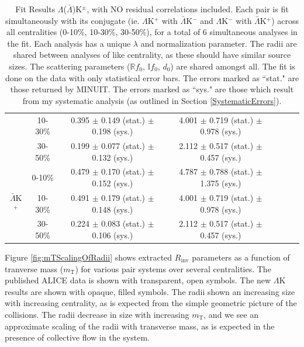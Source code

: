 \documentclass[../AnalysisNoteJBuxton.tex]{subfiles}
\begin{document}
\begin{landscape}
\begin{table}[htbp]
{\begin{tabular}{|c|c|c|c|c|c|c|}
   & 10-30\% & 0.395 $\pm$ 0.149 (stat.) $\pm$ 0.198 (sys.)  %
             & 4.001 $\pm$ 0.719 (stat.) $\pm$ 0.978 (sys.)  %
             & & & \\
             
   & 30-50\% & 0.199 $\pm$ 0.077 (stat.) $\pm$ 0.132 (sys.)  %
             & 2.112 $\pm$ 0.517 (stat.) $\pm$ 0.457 (sys.)  %
             & & & \\
  \cline{1-4}  
  \multirow{3}{*}{$\bar{\Lambda}$K$^{+}$}  
   &  0-10\% & 0.479 $\pm$ 0.170 (stat.) $\pm$ 0.152 (sys.)  %
             & 4.787 $\pm$ 0.788 (stat.) $\pm$ 1.375 (sys.)  %
             & & & \\
             
   & 10-30\% & 0.491 $\pm$ 0.179 (stat.) $\pm$ 0.148 (sys.)  %
             & 4.001 $\pm$ 0.719 (stat.) $\pm$ 0.978 (sys.)  %
             & & & \\
             
   & 30-50\% & 0.224 $\pm$ 0.083 (stat.) $\pm$ 0.106 (sys.)  %
             & 2.112 $\pm$ 0.517 (stat.) $\pm$ 0.457 (sys.)  %
             & & & \\
  \hline
 \end{tabular}}
 \caption{Fit Results $\Lambda$($\bar{\Lambda}$)K$^{\pm}$, with NO residual correlations included.
 Each pair is fit simultaneously with its conjugate (ie. $\Lambda$K$^{+}$ with $\bar{\Lambda}$K$^{-}$ and $\Lambda$K$^{-}$ with $\bar{\Lambda}$K$^{+}$) across all centralities (0-10\%, 10-30\%, 30-50\%), for a total of 6 simultaneous analyses in the fit.
 Each analysis has a unique $\lambda$ and normalization parameter.
 The radii are shared between analyses of like centrality, as these should have similar source sizes.
 The scattering parameters ($\mathbb{R}f_{0}$, $\mathbb{I}f_{0}$, $d_{0}$) are shared amongst all.
 The fit is done on the data with only statistical error bars.
 The errors marked as ``stat." are those returned by MINUIT.
 The errors marked as ``sys." are those which result from my systematic analysis (as outlined in Section \ref{SystematicErrors}).}
 \label{tab:FitResultsLamKch_NoRes}
\end{table}

\end{landscape}
\pagestyle{plain}

Figure \ref{fig:mTScalingOfRadii} shows extracted $R_{\mathrm{inv}}$ parameters as a function of tranverse mass ($m_{\mathrm{T}}$) for various pair systems over several centralities.  The published ALICE data \cite{Adam:2015vja} is shown with transparent, open symbols.  The new $\Lambda$K results are shown with opaque, filled symbols.  The radii shown an increasing size with increasing centrality, as is expected from the simple geometric picture of the collisions.  The radii decrease in size with increasing $m_{\mathrm{T}}$, and we see an approximate scaling of the radii with transverse mass, as is expected in the presence of collective flow in the system.
\end{document}
